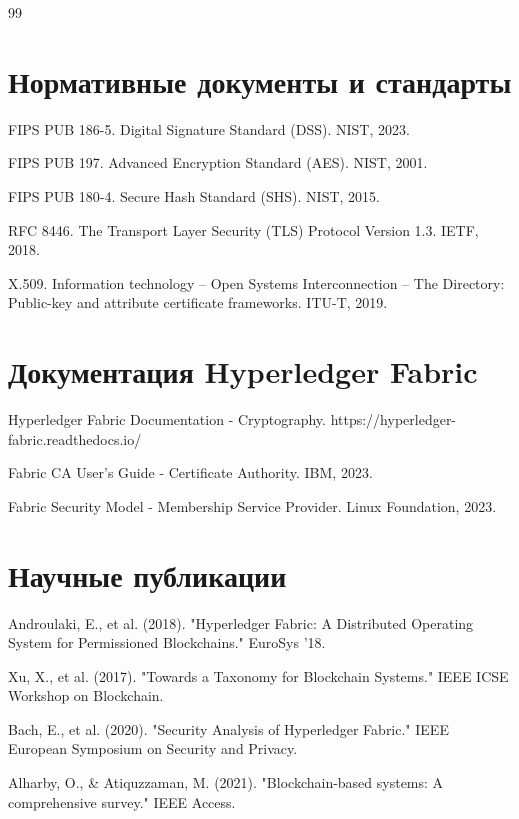 \documentclass[a4paper,14pt]{extreport}
\begin{document}
\begin{thebibliography}{99}

\section*{Нормативные документы и стандарты}

 FIPS PUB 186-5. Digital Signature Standard (DSS). NIST, 2023.

 FIPS PUB 197. Advanced Encryption Standard (AES). NIST, 2001.

 FIPS PUB 180-4. Secure Hash Standard (SHS). NIST, 2015.

 RFC 8446. The Transport Layer Security (TLS) Protocol Version 1.3. IETF, 2018.

 X.509. Information technology – Open Systems Interconnection – The Directory: Public-key and attribute certificate frameworks. ITU-T, 2019.

\section*{Документация Hyperledger Fabric}

 Hyperledger Fabric Documentation - Cryptography. https://hyperledger-fabric.readthedocs.io/

 Fabric CA User's Guide - Certificate Authority. IBM, 2023.

 Fabric Security Model - Membership Service Provider. Linux Foundation, 2023.

\section*{Научные публикации}

 Androulaki, E., et al. (2018). "Hyperledger Fabric: A Distributed Operating System for Permissioned Blockchains." EuroSys '18.

 Xu, X., et al. (2017). "Towards a Taxonomy for Blockchain Systems." IEEE ICSE Workshop on Blockchain.

 Bach, E., et al. (2020). "Security Analysis of Hyperledger Fabric." IEEE European Symposium on Security and Privacy.

 Alharby, O., \& Atiquzzaman, M. (2021). "Blockchain-based systems: A comprehensive survey." IEEE Access.


\end{thebibliography}
\end{document}
